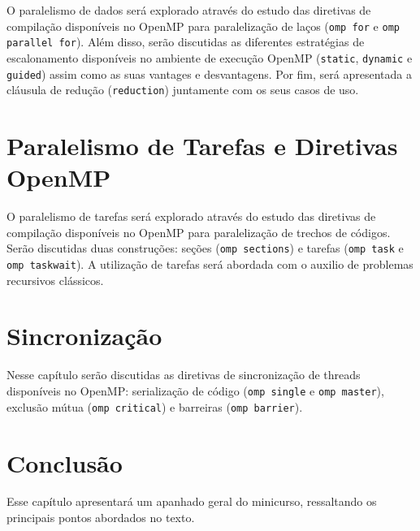 \documentclass{SBCbookchapter}
\begin{document}
	O paralelismo de dados será explorado através do estudo das diretivas de
	compilação disponíveis no OpenMP para paralelização de laços
	(\texttt{omp for} e \texttt{omp parallel for}). Além disso, serão
	discutidas as diferentes estratégias de escalonamento disponíveis no
	ambiente de execução OpenMP (\texttt{static}, \texttt{dynamic} e
	\texttt{guided}) assim como as suas vantages e desvantagens. Por fim,
	será apresentada a cláusula de redução (\texttt{reduction}) juntamente
	com os seus casos de uso.

\section{Paralelismo de Tarefas e Diretivas OpenMP}

	O paralelismo de tarefas será explorado através do estudo das diretivas
	de compilação disponíveis no OpenMP para paralelização de trechos de
	códigos. Serão discutidas duas construções: seções (\texttt{omp
	sections}) e tarefas (\texttt{omp task} e \texttt{omp taskwait}). A
	utilização de tarefas será abordada com o auxilio de problemas
	recursivos clássicos.

\section{Sincronização}
\label{section: sincronizacao}

	Nesse capítulo serão discutidas as diretivas de sincronização de threads
	disponíveis no OpenMP: serialização de código (\texttt{omp single} e
	\texttt{omp master}), exclusão mútua (\texttt{omp critical}) e barreiras
	(\texttt{omp barrier}).

\section{Conclusão}

	Esse capítulo apresentará um apanhado geral do minicurso, ressaltando os
	principais pontos abordados no texto.


\end{document}
